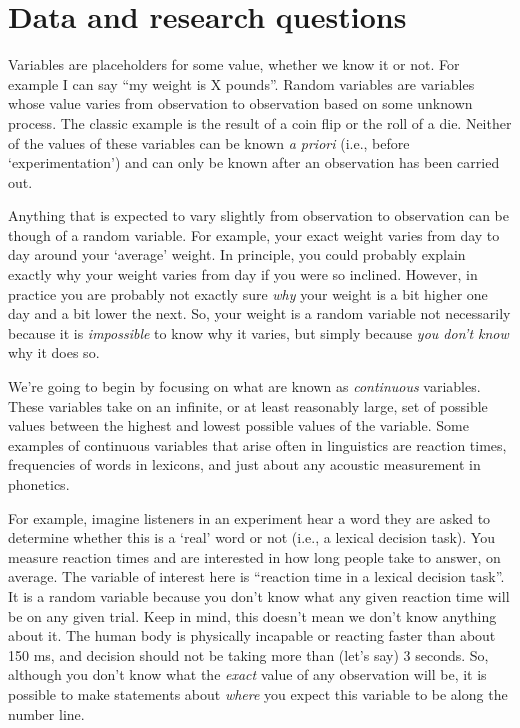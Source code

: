 \documentclass[
]{book}
\begin{document}
\hypertarget{data-and-research-questions}{%
\section{Data and research questions}\label{data-and-research-questions}}

Variables are placeholders for some value, whether we know it or not. For example I can say ``my weight is X pounds''. Random variables are variables whose value varies from observation to observation based on some unknown process. The classic example is the result of a coin flip or the roll of a die. Neither of the values of these variables can be known \emph{a priori} (i.e., before `experimentation') and can only be known after an observation has been carried out.

Anything that is expected to vary slightly from observation to observation can be though of a random variable. For example, your exact weight varies from day to day around your `average' weight. In principle, you could probably explain exactly why your weight varies from day if you were so inclined. However, in practice you are probably not exactly sure \emph{why} your weight is a bit higher one day and a bit lower the next. So, your weight is a random variable not necessarily because it is \emph{impossible} to know why it varies, but simply because \emph{you don't know} why it does so.

We're going to begin by focusing on what are known as \emph{continuous} variables. These variables take on an infinite, or at least reasonably large, set of possible values between the highest and lowest possible values of the variable. Some examples of continuous variables that arise often in linguistics are reaction times, frequencies of words in lexicons, and just about any acoustic measurement in phonetics.

For example, imagine listeners in an experiment hear a word they are asked to determine whether this is a `real' word or not (i.e., a lexical decision task). You measure reaction times and are interested in how long people take to answer, on average. The variable of interest here is ``reaction time in a lexical decision task''. It is a random variable because you don't know what any given reaction time will be on any given trial. Keep in mind, this doesn't mean we don't know anything about it. The human body is physically incapable or reacting faster than about 150 ms, and decision should not be taking more than (let's say) 3 seconds. So, although you don't know what the \emph{exact} value of any observation will be, it is possible to make statements about \emph{where} you expect this variable to be along the number line.
\end{document}
